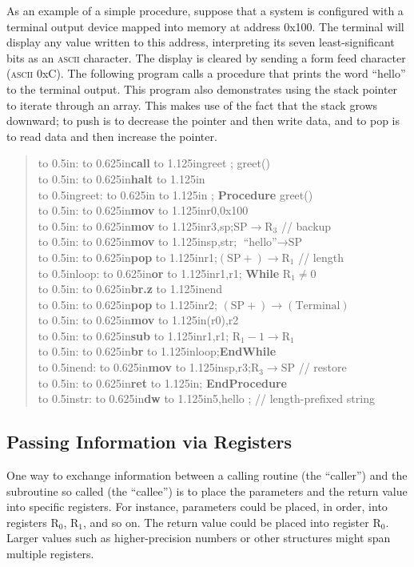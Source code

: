 \documentclass[12pt,english]{book}
\newcommand*{\asmstyle}{\noindent\ttfamily\selectfont\small}
\newcommand*{\asmline}[3][]{%
\null\hbox to 0.5in{\ifx#1\empty\else{#1}:\fi\hss}%
\hbox to 0.625in{\textbf{#2}\hss}%
\hbox to 1.125in{#3\hss}}
\begin{document}
As an example of a simple procedure,
suppose that a system is configured
with a terminal output device mapped into memory
at address 0x100.
The terminal will display any value written to this address,
interpreting its seven least-significant bits
as an \textsc{ascii} character.
The display is cleared by sending a form feed character
(\textsc{ascii} 0xC).
The following program calls a procedure
that prints the word ``hello'' to the terminal output.
This program also demonstrates using the stack pointer
to iterate through an array.
This makes use of the fact that the stack grows downward;
to push is to decrease the pointer and then write data,
and to pop is to read data and then increase the pointer.

\begin{quote}\asmstyle
  \asmline{call}{\textunderscore greet}%
  ; greet()\\
  \asmline{halt}{}\\
  \asmline[\textunderscore greet]{}{}%
  ; \textbf{Procedure} greet()\\
  \asmline{mov}{r0,0x100}\\
  \asmline{mov}{r3,sp};\qquad \(\text{SP}\rightarrow\text{R}_3\)
  // backup\\
  \asmline{mov}{sp,str};\qquad
  \(\text{``hello''}\rightarrow\text{SP}\)\\
  \asmline{pop}{r1};\qquad\((\text{SP}+)\rightarrow\text{R}_1\)
  // length\\
  \asmline[loop]{or}{r1,r1};\qquad
  \textbf{While} \(\text{R}_1 \neq 0\)\\
  \asmline{br.z}{end}\\
  \asmline{pop}{r2};\qquad\qquad
  \((\text{SP}+)\rightarrow(\text{Terminal})\)\\
  \asmline{mov}{(r0),r2}\\
  \asmline{sub}{r1,r1};\qquad\qquad
  \(\text{R}_1-1\rightarrow\text{R}_1\)\\
  \asmline{br}{loop};\qquad \textbf{EndWhile}\\
  \asmline[end]{mov}{sp,r3};\qquad \(\text{R}_3\rightarrow\text{SP}\)
  // restore\\
  \asmline{ret}{}; \textbf{EndProcedure}\\
  \asmline[str]{dw}{5,\textquotedbl hello\textquotedbl}%
  ; // length-prefixed string
\end{quote}

\subsection{Passing Information via Registers}
One way to exchange information between a calling routine
(the ``caller'') and the subroutine so called (the ``callee'')
is to place the parameters and the return value into specific registers.
For instance, parameters could be placed,
in order, into registers \(\text{R}_0\), \(\text{R}_1\), and so on.
The return value could be placed into register \(\text{R}_0\).
Larger values such as higher-precision numbers
or other structures might span multiple registers.
\end{document}
